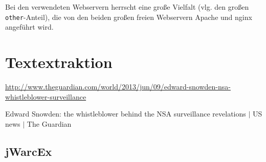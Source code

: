 \documentclass[a4paper,12pt,titlepage=false]{scrreprt}
\begin{document}
\noindent
Bei den verwendeten Webservern herrscht eine große Vielfalt (vlg. den großen \texttt{other}-Anteil), die von den beiden großen freien Webservern Apache und nginx angeführt wird.



\chapter{Textextraktion}


\scriptsize
\vspace{.1cm}
\url{http://www.theguardian.com/world/2013/jun/09/edward-snowden-nsa-whistleblower-surveillance}

\scriptsize
Edward Snowden: the whistleblower behind the NSA surveillance revelations $|$ US news $|$ The Guardian

\section{jWarcEx}
\end{document}
